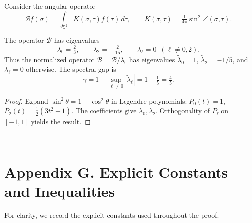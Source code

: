 \documentclass[11pt]{article}
\begin{document}
Consider the angular operator
\[
\mathcal{B}f(\sigma) = \int_{\mathbb{S}^2} K(\sigma,\tau) f(\tau)\, d\tau,
\qquad K(\sigma,\tau) = \tfrac{1}{4\pi}\sin^2\angle(\sigma,\tau).
\]

\begin{lemma}\label{lem:spectral}
The operator $\mathcal{B}$ has eigenvalues
\[
\lambda_0 = \tfrac{2}{3}, \qquad \lambda_2 = -\tfrac{2}{15}, \qquad \lambda_\ell=0 \;\; (\ell\ne 0,2).
\]
Thus the normalized operator $\tilde{\mathcal{B}} = \mathcal{B}/\lambda_0$ has eigenvalues $\tilde{\lambda}_0=1$, $\tilde{\lambda}_2=-1/5$, and $\tilde{\lambda}_\ell=0$ otherwise. The spectral gap is
\[
\gamma = 1 - \sup_{\ell\ne 0} |\tilde{\lambda}_\ell| = 1 - \tfrac{1}{5} = \tfrac{4}{5}.
\]
\end{lemma}

\begin{proof}
Expand $\sin^2\theta = 1 - \cos^2\theta$ in Legendre polynomials: $P_0(t)=1$, $P_2(t)=\tfrac{1}{2}(3t^2-1)$. The coefficients give $\lambda_0,\lambda_2$. Orthogonality of $P_\ell$ on $[-1,1]$ yields the result.
\end{proof}

---

\section{Appendix G. Explicit Constants and Inequalities}

For clarity, we record the explicit constants used throughout the proof.
\end{document}

